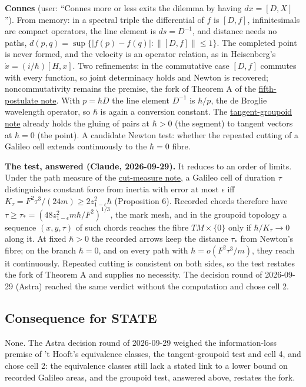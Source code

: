 \documentclass[11pt,a4paper]{article}
\begin{document}
\textbf{Connes} (user: ``Connes more or less exits the dilemma by having
\(dx=[D,X]\)''). From memory: in a spectral triple the differential of
\(f\) is \([D,f]\), infinitesimals are compact operators, the line
element is \(ds=D^{-1}\), and distance needs no paths,
\(d(p,q)=\sup\{|f(p)-f(q)|:\|[D,f]\|\le1\}\). The completed point is
never formed, and the velocity is an operator relation, as in
Heisenberg's \(\dot x=(i/\hbar)[H,x]\). Two refinements: in the
commutative case \([D,f]\) commutes with every function, so joint
determinacy holds and Newton is recovered; noncommutativity remains the
premise, the fork of Theorem A of the
\href{principia-fifth-postulate.md}{fifth-postulate note}. With
\(p=\hbar D\) the line element \(D^{-1}\) is \(\hbar/p\), the de Broglie
wavelength operator, so \(\hbar\) is again a conversion constant. The
\href{tangent-groupoid-trajectories.md}{tangent-groupoid note} already
holds the gluing of pairs at \(\hbar>0\) (the segment) to tangent
vectors at \(\hbar=0\) (the point). A candidate Newton test: whether the
repeated cutting of a Galileo cell extends continuously to the
\(\hbar=0\) fibre.

\textbf{The test, answered (Claude, 2026-09-29).} It reduces to an order
of limits. Under the path measure of the
\href{cut-measure-newton.md}{cut-measure note}, a Galileo cell of
duration \(\tau\) distinguishes constant force from inertia with error
at most \(\epsilon\) iff
\(K_\tau=F^2\tau^3/(24m)\ge2z_{1-\epsilon}^2\hbar\) (Proposition 6).
Recorded chords therefore have
\(\tau\ge\tau_*=(48z_{1-\epsilon}^2m\hbar/F^2)^{1/3}\), the mark mesh,
and in the groupoid topology a sequence \((x,y,\tau)\) of such chords
reaches the fibre \(TM\times\{0\}\) only if \(\hbar/K_\tau\to0\) along
it. At fixed \(\hbar>0\) the recorded arrows keep the distance
\(\tau_*\) from Newton's fibre; on the branch \(\hbar=0\), and on every
path with \(\hbar=o(F^2\tau^3/m)\), they reach it continuously. Repeated
cutting is consistent on both sides, so the test restates the fork of
Theorem A and supplies no necessity. The decision round of 2026-09-29
(Astra) reached the same verdict without the computation and chose cell
2.

\hypertarget{consequence-for-state}{%
\subsection{Consequence for STATE}\label{consequence-for-state}}

None. The Astra decision round of 2026-09-29 weighed the
information-loss premise of 't Hooft's equivalence classes, the
tangent-groupoid test and cell 4, and chose cell 2: the equivalence
classes still lack a stated link to a lower bound on recorded Galileo
areas, and the groupoid test, answered above, restates the fork.
\end{document}
